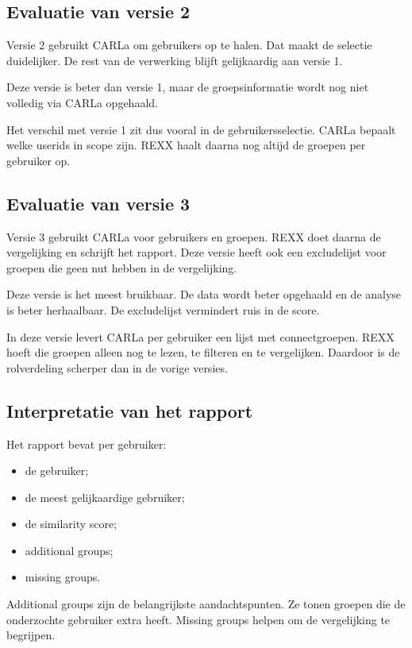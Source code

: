 \subsection*{Evaluatie van versie 2}

Versie 2 gebruikt CARLa om gebruikers op te halen. Dat maakt de selectie duidelijker. De rest van de verwerking blijft gelijkaardig aan versie 1.

Deze versie is beter dan versie 1, maar de groepsinformatie wordt nog niet volledig via CARLa opgehaald.

Het verschil met versie 1 zit dus vooral in de gebruikersselectie. CARLa bepaalt welke userids in scope zijn. REXX haalt daarna nog altijd de groepen per gebruiker op.

\subsection*{Evaluatie van versie 3}

Versie 3 gebruikt CARLa voor gebruikers en groepen. REXX doet daarna de vergelijking en schrijft het rapport. Deze versie heeft ook een excludelijst voor groepen die geen nut hebben in de vergelijking.

Deze versie is het meest bruikbaar. De data wordt beter opgehaald en de analyse is beter herhaalbaar. De excludelijst vermindert ruis in de score.

In deze versie levert CARLa per gebruiker een lijst met connectgroepen. REXX hoeft die groepen alleen nog te lezen, te filteren en te vergelijken. Daardoor is de rolverdeling scherper dan in de vorige versies.

\subsection*{Interpretatie van het rapport}

Het rapport bevat per gebruiker:

\begin{itemize}
	\item de gebruiker;
	\item de meest gelijkaardige gebruiker;
	\item de similarity score;
	\item additional groups;
	\item missing groups.
\end{itemize}

Additional groups zijn de belangrijkste aandachtspunten. Ze tonen groepen die de onderzochte gebruiker extra heeft. Missing groups helpen om de vergelijking te begrijpen.

